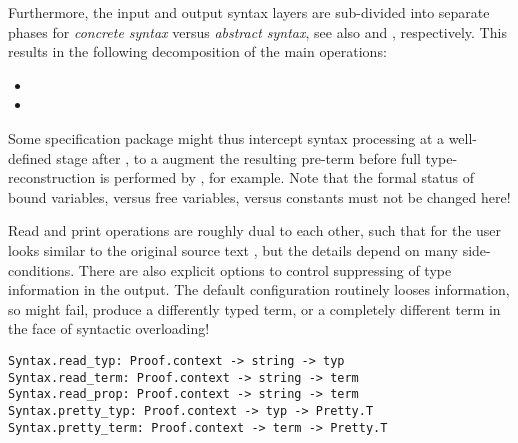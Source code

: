 \begin{isabellebody}
\begin{isamarkuptext}
  Furthermore, the input and output syntax layers are sub-divided into
  separate phases for \emph{concrete syntax} versus \emph{abstract
  syntax}, see also  and
  , respectively.  This results in the
  following decomposition of the main operations:

  \begin{itemize}

  \item {}

  \item {}

  \end{itemize}

  Some specification package might thus intercept syntax processing at
  a well-defined stage after , to a augment the
  resulting pre-term before full type-reconstruction is performed by
  , for example.  Note that the formal status of bound
  variables, versus free variables, versus constants must not be
  changed here!%
\end{isamarkuptext}%
\isamarkuptrue%
%
\isamarkuptrue%
%
\begin{isamarkuptext}%
Read and print operations are roughly dual to each other, such
  that for the user  looks similar to
  the original source text , but the details depend on many
  side-conditions.  There are also explicit options to control
  suppressing of type information in the output.  The default
  configuration routinely looses information, so  might fail, produce a differently typed term, or a
  completely different term in the face of syntactic overloading!%
\end{isamarkuptext}%
\isamarkuptrue%
%
\isadelimmlref
%
\endisadelimmlref
%
\isatagmlref
%
\begin{isamarkuptext}%
\begin{mldecls}
  \verb|Syntax.read_typ: Proof.context -> string -> typ| \\
  \verb|Syntax.read_term: Proof.context -> string -> term| \\
  \verb|Syntax.read_prop: Proof.context -> string -> term| \\
  \verb|Syntax.pretty_typ: Proof.context -> typ -> Pretty.T| \\
  \verb|Syntax.pretty_term: Proof.context -> term -> Pretty.T| \\
  \end{mldecls}


\end{isamarkuptext}
\end{isabellebody}
